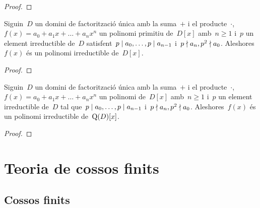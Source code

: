\documentclass[../../main.tex]{subfiles}
\begin{document}
    \begin{proof}
    \end{proof}
    \begin{theorem}
        \label{thm:Criteri d'Eisenstein}
        Siguin~\(D\) un domini de factorització única amb la suma~\(+\) i el producte~\(\cdot\),~\(f(x)=a_{0}+a_{1}x+\dots+a_{n}x^{n}\) un polinomi primitiu de~\(D[x]\) amb~\(n\geq1\) i~\(p\) un element irreductible de~\(D\) satisfent~\(p\mathrel{|} a_{0},\dots,p\mathrel{|} a_{n-1}\) i~\(p\mathrel{\nmid} a_{n},p^{2}\mathrel{\nmid} a_{0}\).
        Aleshores~\(f(x)\) és un polinomi irreductible de~\(D[x]\).
    \end{theorem}
    \begin{proof}
    \end{proof}
    \begin{corollary}
        Siguin~\(D\) un domini de factorització única amb la suma~\(+\) i el producte~\(\cdot\),~\(f(x)=a_{0}+a_{1}x+\dots+a_{n}x^{n}\) un polinomi de~\(D[x]\) amb~\(n\geq1\) i~\(p\) un element irreductible de~\(D\) tal que~\(p\mathrel{|} a_{0},\dots,p\mathrel{|} a_{n-1}\) i~\(p\mathrel{\nmid} a_{n},p^{2}\mathrel{\nmid} a_{0}\).
        Aleshores~\(f(x)\) és un polinomi irreductible de~\(\operatorname{Q}(D)[x]\).
    \end{corollary}
    \begin{proof}
    \end{proof}
\chapter{Teoria de cossos finits}
\section{Cossos finits}
\end{document}
